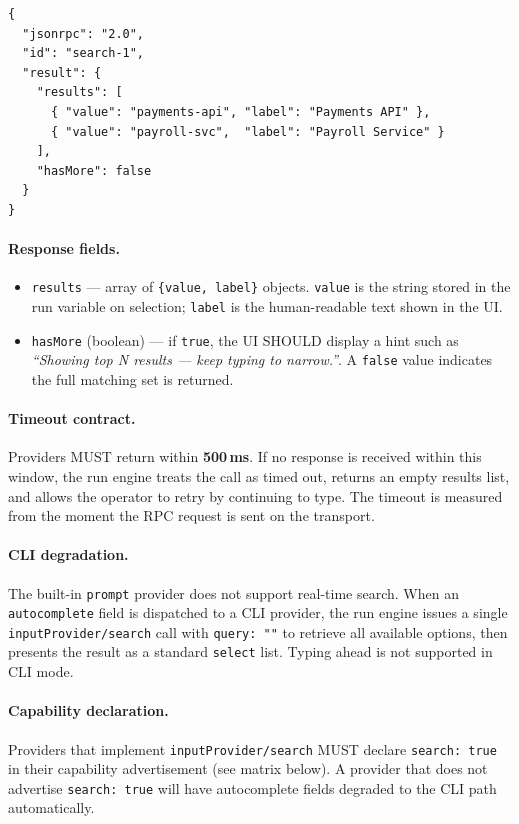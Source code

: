 \begin{verbatim}
{
  "jsonrpc": "2.0",
  "id": "search-1",
  "result": {
    "results": [
      { "value": "payments-api", "label": "Payments API" },
      { "value": "payroll-svc",  "label": "Payroll Service" }
    ],
    "hasMore": false
  }
}
\end{verbatim}

\paragraph{Response fields.}
\begin{itemize}
  \item \texttt{results} — array of \texttt{\{value, label\}} objects.  \texttt{value}
        is the string stored in the run variable on selection; \texttt{label} is the
        human-readable text shown in the UI.
  \item \texttt{hasMore} (boolean) — if \texttt{true}, the UI SHOULD display a hint
        such as \emph{``Showing top N results — keep typing to narrow.''}.  A
        \texttt{false} value indicates the full matching set is returned.
\end{itemize}

\paragraph{Timeout contract.}
Providers MUST return within \textbf{500\,ms}.  If no response is received within this
window, the run engine treats the call as timed out, returns an empty results list, and
allows the operator to retry by continuing to type.  The timeout is measured from the
moment the RPC request is sent on the transport.

\paragraph{CLI degradation.}
The built-in \texttt{prompt} provider does not support real-time search.  When an
\texttt{autocomplete} field is dispatched to a CLI provider, the run engine issues a
single \texttt{inputProvider/search} call with \texttt{query: ""} to retrieve all
available options, then presents the result as a standard \texttt{select} list.  Typing
ahead is not supported in CLI mode.

\paragraph{Capability declaration.}
Providers that implement \texttt{inputProvider/search} MUST declare \texttt{search: true}
in their capability advertisement (see matrix below).  A provider that does not advertise
\texttt{search: true} will have autocomplete fields degraded to the CLI path automatically.

